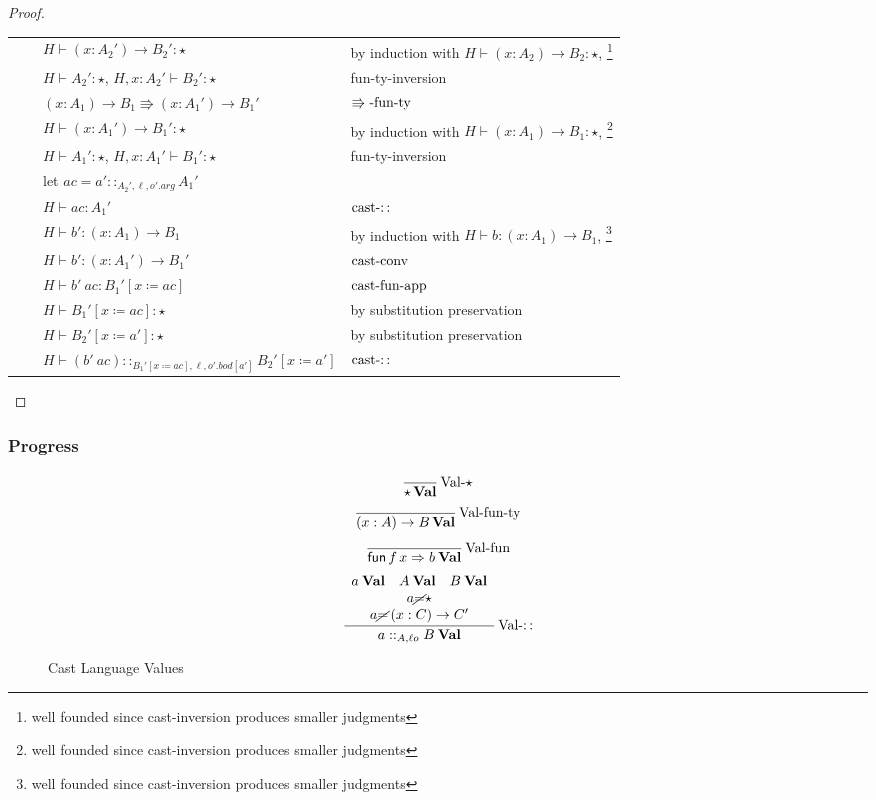 \begin{proof}
\begin{tabular}{llll}
 &  & $H\vdash\left(x:A_{2}'\right)\rightarrow B_{2}':\star$ & by induction with $H\vdash\left(x:A_{2}\right)\rightarrow B_{2}:\star$,
\footnote{well founded since cast-inversion produces smaller judgments}\tabularnewline
 &  & $H\vdash A_{2}':\star$, $H,x:A_{2}'\vdash B_{2}':\star$ & fun-ty-inversion\tabularnewline
 &  & $\left(x:A_{1}\right)\rightarrow B_{1}\Rrightarrow\left(x:A_{1}'\right)\rightarrow B_{1}'$ & $\operatorname{\Rrightarrow-fun-ty}$\tabularnewline
 &  & $H\vdash\left(x:A_{1}'\right)\rightarrow B_{1}':\star$ & by induction with $H\vdash\left(x:A_{1}\right)\rightarrow B_{1}:\star$,
\footnote{well founded since cast-inversion produces smaller judgments}\tabularnewline
 &  & $H\vdash A_{1}':\star$, $H,x:A_{1}'\vdash B_{1}':\star$ & fun-ty-inversion\tabularnewline
 &  & let $ac=a'::_{A_{2}',\ell,o'.arg}A_{1}'$ & \tabularnewline
 &  & $H\vdash ac:A_{1}'$ & $\operatorname{cast-::}$\tabularnewline
 &  & $H\vdash b':\left(x:A_{1}\right)\rightarrow B_{1}$ & by induction with $H\vdash b:\left(x:A_{1}\right)\rightarrow B_{1}$,
\footnote{well founded since cast-inversion produces smaller judgments}\tabularnewline
 &  & $H\vdash b':\left(x:A_{1}'\right)\rightarrow B_{1}'$ & $\operatorname{cast-conv}$\tabularnewline
 &  & $H\vdash b'\ ac:B_{1}'\left[x\coloneqq ac\right]$ & $\operatorname{cast-fun-app}$\tabularnewline
 &  & $H\vdash B_{1}'\left[x\coloneqq ac\right]:\star$ & by substitution preservation\tabularnewline
 &  & $H\vdash B_{2}'\left[x\coloneqq a'\right]:\star$ & by substitution preservation\tabularnewline
 &  & $H\vdash\left(b'\ ac\right)::_{B_{1}'\left[x\coloneqq ac\right],\ensuremath{\ell},o'.bod[a']}B_{2}'\left[x\coloneqq a'\right]$ & $\operatorname{cast-::}$\tabularnewline
\end{tabular}
\end{proof}


\subsubsection{Progress}

\begin{figure}
\[
\frac{\,}{\star\,\textbf{Val}}\operatorname{Val-\star}
\]
\[
\frac{\,}{\left(x:A\right)\rightarrow B\,\textbf{Val}}\operatorname{Val-fun-ty}
\]
\[
\frac{\,}{\mathsf{fun}\,f\,x\Rightarrow b\:\textbf{Val}}\operatorname{Val-fun}
\]
\[
\frac{\begin{array}{c}
a\:\textbf{Val}\quad A\:\textbf{Val}\quad B\:\textbf{Val}\\
a\cancel{=}\star\\
a\cancel{=}\left(x:C\right)\rightarrow C'
\end{array}}{a::_{A,\ell o}B\:\textbf{Val}}\operatorname{Val-::}
\]
\caption{Cast Language Values}
\label{fig:cast-val}
\end{figure}

